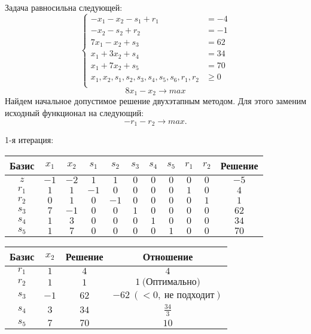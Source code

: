 \documentclass{article}%
\begin{document}
Задача равносильна следующей: %
\[%
\left\{\begin{aligned}-x_{1}-x_{2}-s_{1}+r_{1} & =-4 \\-x_{2}-s_{2}+r_{2} & =-1 \\7x_{1}-x_{2}+s_{3} & =62 \\x_{1}+3x_{2}+s_{4} & =34 \\x_{1}+7x_{2}+s_{5} & =70 \\x_{1},x_{2},s_{1},s_{2},s_{3},s_{4},s_{5},s_{6},r_{1},r_{2} & \ge 0 \\ \end{aligned}\right.%
\]%
\[%
8x_{1}-x_{2}  \to max%
\]%
Найдем начальное допустимое решение двухэтапным методом. Для этого заменим исходный функционал на следующий: %
\[%
-r_{1}-r_{2}\to max.%
\]%
\begin{flushleft}%
1{-}я итерация: %
\newline%
\newline%
\renewcommand{\arraystretch}{1.3}%
\begin{tabular}{|c|ccccccccc|c|}%
\hline%
Базис&$x_{1}$&$x_{2}$&$s_{1}$&$s_{2}$&$s_{3}$&$s_{4}$&$s_{5}$&$r_{1}$&$r_{2}$&Решение\\%
\hline%
$z$&$-1$&$-2$&$1$&$1$&$0$&$0$&$0$&$0$&$0$&$-5$\\%
\hline%
$r_{1}$&$1$&$1$&$-1$&$0$&$0$&$0$&$0$&$1$&$0$&$4$\\%
$r_{2}$&$0$&$1$&$0$&$-1$&$0$&$0$&$0$&$0$&$1$&$1$\\%
$s_{3}$&$7$&$-1$&$0$&$0$&$1$&$0$&$0$&$0$&$0$&$62$\\%
$s_{4}$&$1$&$3$&$0$&$0$&$0$&$1$&$0$&$0$&$0$&$34$\\%
$s_{5}$&$1$&$7$&$0$&$0$&$0$&$0$&$1$&$0$&$0$&$70$\\%
\hline%
\end{tabular}%
\newline%
\newline%
\newline%
\begin{tabular}{|cccc|}%
\hline%
Базис&$x_{2}$&Решение&Отношение\\%
\hline%
$r_{1}$&$1$&$4$&$4$\\%
$r_{2}$&$1$&$1$&$1\: \text{(Оптимально)}$\\%
$s_{3}$&$-1$&$62$&$-62\: (< 0, \: \text{не подходит})$\\%
$s_{4}$&$3$&$34$&$\frac{34}{3}$\\%
$s_{5}$&$7$&$70$&$10$\\%
\hline%
\end{tabular}%
\newline%

\end{flushleft}
\end{document}
